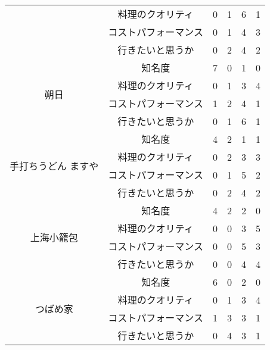 \begin{table}[H]
{\begin{tabular}{|c|c|r|r|r|r|}
 & 料理のクオリティ & 0 & 1 & 6 & 1 \\ \cline{2-6} 
 & コストパフォーマンス & 0 & 1 & 4 & 3 \\ \cline{2-6} 
 & 行きたいと思うか & 0 & 2 & 4 & 2 \\ \hline
\multirow{4}{*}{朔日} & 知名度 & 7 & 0 & 1 & 0 \\ \cline{2-6} 
 & 料理のクオリティ & 0 & 1 & 3 & 4 \\ \cline{2-6} 
 & コストパフォーマンス & 1 & 2 & 4 & 1 \\ \cline{2-6} 
 & 行きたいと思うか & 0 & 1 & 6 & 1 \\ \hline
\multirow{4}{*}{手打ちうどん ますや} & 知名度 & 4 & 2 & 1 & 1 \\ \cline{2-6} 
 & 料理のクオリティ & 0 & 2 & 3 & 3 \\ \cline{2-6} 
 & コストパフォーマンス & 0 & 1 & 5 & 2 \\ \cline{2-6} 
 & 行きたいと思うか & 0 & 2 & 4 & 2 \\ \hline
\multirow{4}{*}{上海小籠包} & 知名度 & 4 & 2 & 2 & 0 \\ \cline{2-6} 
 & 料理のクオリティ & 0 & 0 & 3 & 5 \\ \cline{2-6} 
 & コストパフォーマンス & 0 & 0 & 5 & 3 \\ \cline{2-6} 
 & 行きたいと思うか & 0 & 0 & 4 & 4 \\ \hline
\multirow{4}{*}{つばめ家} & 知名度 & 6 & 0 & 2 & 0 \\ \cline{2-6} 
 & 料理のクオリティ & 0 & 1 & 3 & 4 \\ \cline{2-6} 
 & コストパフォーマンス & 1 & 3 & 3 & 1 \\ \cline{2-6} 
 & 行きたいと思うか & 0 & 4 & 3 & 1 \\ \cline{2-6} 
\end{tabular}
}
\end{table}
